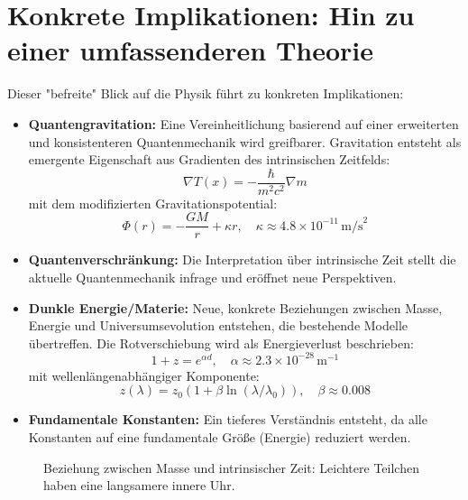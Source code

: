 \documentclass{article}
\newcommand{\Tfield}{T(x)}
\begin{document}
	\section{Konkrete Implikationen: Hin zu einer umfassenderen Theorie}
	Dieser "befreite" Blick auf die Physik führt zu konkreten Implikationen:
	\begin{itemize}
		\item \textbf{Quantengravitation:} Eine Vereinheitlichung basierend auf einer erweiterten und konsistenteren Quantenmechanik wird greifbarer. Gravitation entsteht als emergente Eigenschaft aus Gradienten des intrinsischen Zeitfelds:
		\begin{equation}
			\nabla \Tfield = -\frac{\hbar}{m^2 c^2} \nabla m
		\end{equation}
		mit dem modifizierten Gravitationspotential:
		\begin{equation}
			\Phi(r) = -\frac{GM}{r} + \kappa r, \quad \kappa \approx 4.8 \times 10^{-11} \, \text{m/s}^2
		\end{equation}
		\item \textbf{Quantenverschränkung:} Die Interpretation über intrinsische Zeit stellt die aktuelle Quantenmechanik infrage und eröffnet neue Perspektiven.
		\item \textbf{Dunkle Energie/Materie:} Neue, konkrete Beziehungen zwischen Masse, Energie und Universumsevolution entstehen, die bestehende Modelle übertreffen. Die Rotverschiebung wird als Energieverlust beschrieben:
		\begin{equation}
			1 + z = e^{\alpha d}, \quad \alpha \approx 2.3 \times 10^{-28} \, \text{m}^{-1}
		\end{equation}
		mit wellenlängenabhängiger Komponente:
		\begin{equation}
			z(\lambda) = z_0 (1 + \beta \ln(\lambda/\lambda_0)), \quad \beta \approx 0.008
		\end{equation}
		\item \textbf{Fundamentale Konstanten:} Ein tieferes Verständnis entsteht, da alle Konstanten auf eine fundamentale Größe (Energie) reduziert werden.
	\end{itemize}
	
	\begin{figure}[h]
		\centering
		\caption{Beziehung zwischen Masse und intrinsischer Zeit: Leichtere Teilchen haben eine langsamere innere Uhr.}
	\end{figure}
	
\end{document}
